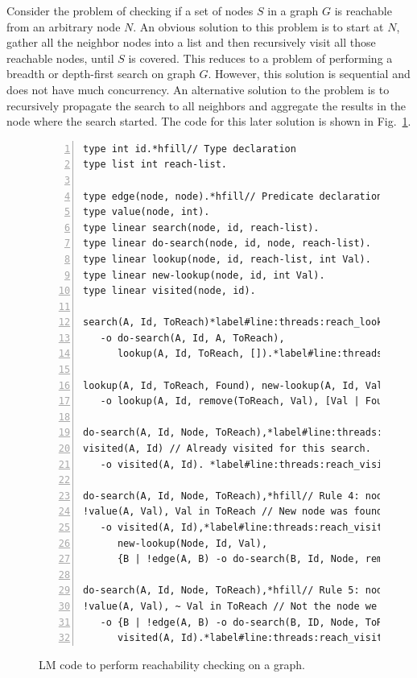 Consider the problem of checking if a set of nodes $S$ in a graph $G$ is
reachable from an arbitrary node $N$. An obvious solution to this problem is to
start at $N$, gather all the neighbor nodes into a list and then recursively
visit all those reachable nodes, until $S$ is covered. This reduces to a problem
of performing a breadth or depth-first search on graph $G$. However, this
solution is sequential and does not have much concurrency.  An alternative
solution to the problem is to recursively propagate the search to all neighbors
and aggregate the results in the node where the search started.  The code for
this later solution is shown in Fig.~\ref{code:threads:reach_simple}.

\begin{figure}[h]
\begin{Verbatim}[numbers=left,fontsize=\codesize,commandchars=*\#\&]
type int id.*hfill// Type declaration
type list int reach-list.

type edge(node, node).*hfill// Predicate declaration
type value(node, int).
type linear search(node, id, reach-list).
type linear do-search(node, id, node, reach-list).
type linear lookup(node, id, reach-list, int Val).
type linear new-lookup(node, id, int Val).
type linear visited(node, id).

search(A, Id, ToReach)*label#line:threads:reach_lookup1&*hfill// Rule 1: initialize search
   -o do-search(A, Id, A, ToReach),
      lookup(A, Id, ToReach, []).*label#line:threads:reach_lookup2&

lookup(A, Id, ToReach, Found), new-lookup(A, Id, Val)*hfill// Rule 2: new reachable node found
   -o lookup(A, Id, remove(ToReach, Val), [Val | Found]).

do-search(A, Id, Node, ToReach),*label#line:threads:reach_visit1&*hfill// Rule 3: node has already seen this search
visited(A, Id) // Already visited for this search.
   -o visited(A, Id). *label#line:threads:reach_visit2&

do-search(A, Id, Node, ToReach),*hfill// Rule 4: node found and propagate search
!value(A, Val), Val in ToReach // New node was found.
   -o visited(A, Id),*label#line:threads:reach_visit_visited1&
      new-lookup(Node, Id, Val),
      {B | !edge(A, B) -o do-search(B, Id, Node, remove(ToReach, Val))}.*label#line:threads:reach_propagate&

do-search(A, Id, Node, ToReach),*hfill// Rule 5: node not found and propagate search
!value(A, Val), ~ Val in ToReach // Not the node we are looking for.
   -o {B | !edge(A, B) -o do-search(B, ID, Node, ToReach)},*label#line:threads:reach_propagate2&
      visited(A, Id).*label#line:threads:reach_visit_visited2&
\end{Verbatim}

\caption{LM code to perform reachability checking on a graph.}
\label{code:threads:reach_simple}
\end{figure}

